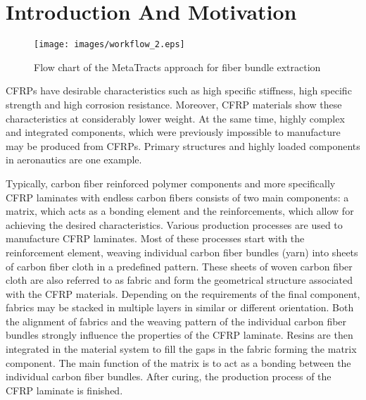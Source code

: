 \section{Introduction And Motivation}\label{sec:intro}
\begin{figure*}[tb]
	\centering
	\texttt{[image: images/workflow\_2.eps]}
	\caption{Flow chart of the MetaTracts approach for fiber bundle extraction}
	\label{fig:flowchart}
\end{figure*}
 CFRPs have desirable characteristics such as high specific stiffness, high specific strength and high corrosion resistance. Moreover, CFRP materials show these characteristics at considerably lower weight. At the same time, highly complex and integrated components, which were previously impossible to manufacture may be produced from CFRPs. Primary structures and highly loaded components in aeronautics are one example.
 
Typically, carbon fiber reinforced polymer components and more specifically CFRP laminates with endless carbon fibers consists of two main components: a matrix, which acts as a bonding element  and the reinforcements, which allow for achieving the desired characteristics. Various production processes are used to manufacture CFRP laminates. Most of these processes start with the reinforcement element, weaving individual carbon fiber bundles (yarn) into sheets of carbon fiber cloth in a predefined pattern. These sheets of woven carbon fiber cloth are also referred to as fabric and form the geometrical structure associated with the CFRP materials. Depending on the requirements of the final component, fabrics may be stacked in multiple layers in similar or different orientation. Both the  alignment of fabrics and the weaving pattern of the individual carbon fiber bundles strongly influence the properties of the CFRP laminate. Resins are then integrated in the material system to fill the gaps in the fabric forming the matrix component. The main function of the matrix is to act as a bonding between the individual carbon fiber bundles. After curing, the production process of the CFRP laminate is finished.

